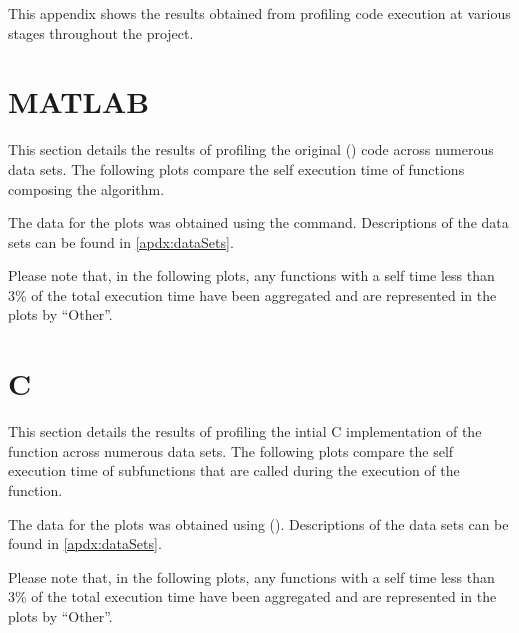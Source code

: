 This appendix shows the results obtained from profiling code execution at
various stages throughout the project.

\section{MATLAB}
\label{profiling:matlab}
This section details the results of profiling the original ()
code across numerous data sets. The following plots compare the self execution
time of functions composing the  algorithm.

The data for the plots was obtained using the 
 command. Descriptions of the data sets can be found in
\autoref{apdx:dataSets}.

Please note that, in the following plots, any functions with a self time less
than 3\% of the total execution time have been aggregated and are represented in
the plots by ``Other''.




\section{C}
\label{profiling:c}
This section details the results of profiling the intial C implementation of the
 function across numerous data sets. The
following plots compare the self execution time of subfunctions that are called
during the execution of the  function.

The data for the plots was obtained using 
(). Descriptions of the data sets can be found in
\autoref{apdx:dataSets}.

Please note that, in the following plots, any functions with a self time less
than 3\% of the total execution time have been aggregated and are represented in
the plots by ``Other''.





